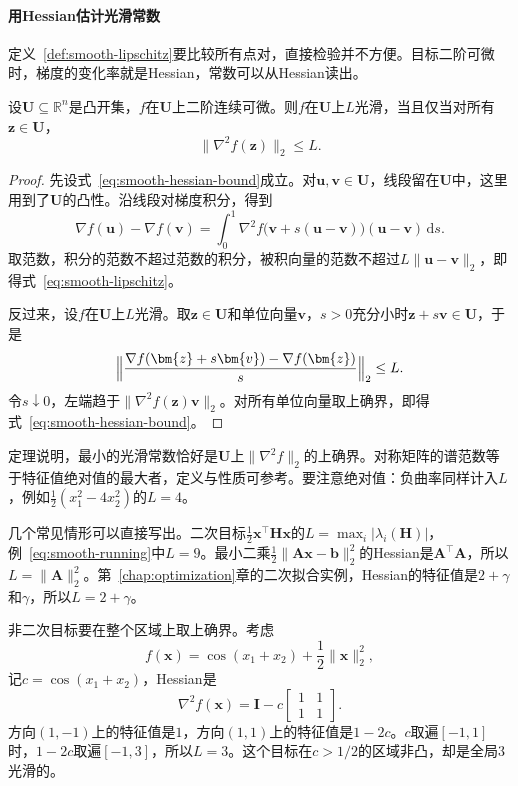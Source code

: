 \paragraph{用Hessian估计光滑常数}
定义~\ref{def:smooth-lipschitz}要比较所有点对，直接检验并不方便。目标二阶可微时，梯度的变化率就是Hessian，常数可以从Hessian读出。

\begin{theorem}[Hessian与光滑常数]
\label{thm:smooth-hessian}
设$\bm{U}\subseteq\mathbb{R}^n$是凸开集，$f$在$\bm{U}$上二阶连续可微。则$f$在$\bm{U}$上$L$光滑，当且仅当对所有$\bm{z}\in\bm{U}$，
\begin{equation}
 \lVert\nabla^2f(\bm{z})\rVert_2\leq L.
 \label{eq:smooth-hessian-bound}
\end{equation}
\end{theorem}

\begin{proof}
先设式~\eqref{eq:smooth-hessian-bound}成立。对$\bm{u},\bm{v}\in\bm{U}$，线段留在$\bm{U}$中，这里用到了$\bm{U}$的凸性。沿线段对梯度积分，得到
\[
 \nabla f(\bm{u})-\nabla f(\bm{v})=\int_0^1\nabla^2f\bigl(\bm{v}+s(\bm{u}-\bm{v})\bigr)(\bm{u}-\bm{v})\,\mathrm{d}s.
\]
取范数，积分的范数不超过范数的积分，被积向量的范数不超过$L\lVert\bm{u}-\bm{v}\rVert_2$，即得式~\eqref{eq:smooth-lipschitz}。

反过来，设$f$在$\bm{U}$上$L$光滑。取$\bm{z}\in\bm{U}$和单位向量$\bm{v}$，$s>0$充分小时$\bm{z}+s\bm{v}\in\bm{U}$，于是
\[
 \Bigl\lVert\frac{\nabla f(\bm{z}+s\bm{v})-\nabla f(\bm{z})}{s}\Bigr\rVert_2\leq L.
\]
令$s\downarrow0$，左端趋于$\lVert\nabla^2f(\bm{z})\bm{v}\rVert_2$。对所有单位向量取上确界，即得式~\eqref{eq:smooth-hessian-bound}。
\end{proof}

定理说明，最小的光滑常数恰好是$\bm{U}$上$\lVert\nabla^2f\rVert_2$的上确界。对称矩阵的谱范数等于特征值绝对值的最大者，定义与性质可参考。要注意绝对值：负曲率同样计入$L$，例如$\frac12(x_1^2-4x_2^2)$的$L=4$。

几个常见情形可以直接写出。二次目标$\frac12\bm{x}^\top\bm{H}\bm{x}$的$L=\max_i\lvert\lambda_i(\bm{H})\rvert$，例~\eqref{eq:smooth-running}中$L=9$。最小二乘$\frac12\lVert\bm{A}\bm{x}-\bm{b}\rVert_2^2$的Hessian是$\bm{A}^\top\bm{A}$，所以$L=\lVert\bm{A}\rVert_2^2$。第~\ref{chap:optimization}章的二次拟合实例，Hessian的特征值是$2+\gamma$和$\gamma$，所以$L=2+\gamma$。

非二次目标要在整个区域上取上确界。考虑
\[
 f(\bm{x})=\cos(x_1+x_2)+\frac12\lVert\bm{x}\rVert_2^2,
\]
记$c=\cos(x_1+x_2)$，Hessian是
\[
 \nabla^2f(\bm{x})=\bm{I}-c\begin{bmatrix}1&1\\1&1\end{bmatrix}.
\]
方向$(1,-1)$上的特征值是$1$，方向$(1,1)$上的特征值是$1-2c$。$c$取遍$[-1,1]$时，$1-2c$取遍$[-1,3]$，所以$L=3$。这个目标在$c>1/2$的区域非凸，却是全局$3$光滑的。

